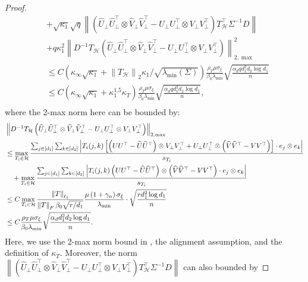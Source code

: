 \documentclass[12pt]{article}
\newcommand{\tF}{{\rm F}}
\newcommand{\abs}[1]{\left\lvert#1\right\rvert}
\newcommand{\norm}[1]{\left\lVert#1\right\rVert}
\newcommand{\cH}{\mathcal{H}}
\def\calH{{\mathcal H}}
\theoremstyle{plain}
\begin{document}
\begin{proof}
\begin{equation*}
\begin{aligned}
     & + \sqrt{\kappa_1}\sqrt{q}\norm{ \left(\widehat U_\perp \widehat U_\perp^\top \otimes \widehat V_\perp \widehat V_\perp^\top - U_\perp U_\perp^\top \otimes V_\perp V_\perp^\top \right) T_{\calH}^\top {\Sigma}^{-1}{D}
     }\\
     & + q \kappa_1^2 \norm{ D^{-1}T_{\calH}\left(\widehat U_\perp \widehat U_\perp^\top \otimes \widehat V_\perp \widehat V_\perp^\top - U_\perp U_\perp^\top \otimes V_\perp V_\perp^\top\right) }_{2,\max}^2 \\
     & \le C\left(\kappa_\infty\sqrt{\kappa_1} +\norm{T_{\calH}}_2\kappa_1/\sqrt{\lambda_{\min}(\Sigma)} \right)\frac{\rho_T \mu \sigma_\xi }{\beta_0 \lambda_{\min} }\sqrt{\frac{\alpha_d q d_1^2 d_2 \log d_1 }{n}} \\
     & \le C\left(\kappa_\infty\sqrt{\kappa_1} +\kappa_1^{1.5}\kappa_T \right)\frac{\rho_T \mu \sigma_\xi }{\beta_0 \lambda_{\min} }\sqrt{\frac{\alpha_d q d_1^2 d_2 \log d_1 }{n}}, \\
    \end{aligned} 
\end{equation*}
where the 2-max norm here can be bounded by:
\begin{equation}
    \begin{aligned}
      &\norm{ D^{-1}T_{\calH}\left(\widehat U_\perp \widehat U_\perp^\top \otimes \widehat V_\perp \widehat V_\perp^\top - U_\perp U_\perp^\top \otimes V_\perp V_\perp^\top\right) }_{2,\max} \\
      &\le \max_{T_i\in \cH }\frac{ \sum_{j\in[d_1] } \sum_{k\in [d_2] } \abs{T_i(j,k) \left[\left(U U^\top-\widehat U \widehat U^\top\right)\otimes V_{\perp}V_\perp^\top +  U_\perp U_\perp^\top \otimes \left(\widehat V \widehat V^\top -V V^\top \right) \right]\cdot e_j \otimes e_k} }{s_{T_i}  }\\
      & \quad + \max_{T_i\in \cH }\frac{ \sum_{j\in[d_1] } \sum_{k\in [d_2] } \abs{T_i(j,k) \left(U U^\top-\widehat U \widehat U^\top\right)\otimes \left(\widehat V \widehat V^\top -V V^\top \right) \cdot e_j \otimes e_k} }{s_{T_i}  }\\
      & \le C\max_{T_i\in \cH } \frac{\norm{T}_{\ell_1 } }{ \norm{T}_\tF \beta_0 \sqrt{r/d_1} } \frac{ \mu\left(1+\gamma_{n}\right) \sigma_{\xi}}{\lambda_{\min}} \cdot \sqrt{\frac{rd_1^2 \log d_1}{n}}   \\
      & \le C\frac{\rho_T \mu \sigma_\xi }{\beta_0 \lambda_{\min} }\sqrt{\frac{\alpha_d d_1^2 d_2 \log d_1 }{n}}.
    \end{aligned}
\end{equation}
Here, we use the 2-max norm bound in \cite{xia2021statistical}, the alignment assumption, and the definition of $\kappa_T$. Moreover, the norm $\norm{ \left(\widehat U_\perp \widehat U_\perp^\top \otimes \widehat V_\perp \widehat V_\perp^\top - U_\perp U_\perp^\top \otimes V_\perp V_\perp^\top \right) T_{\calH}^\top {\Sigma}^{-1}{D}
     }$ can also bounded by 


\end{proof}
\end{document}
